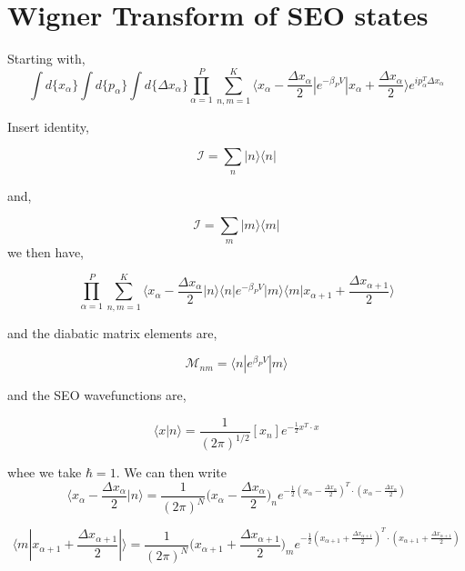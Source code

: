 \section{Wigner Transform of SEO states}
Starting with,
\begin{equation}
\int d \{x_{\alpha}\} \int d \{p_{\alpha}\} \int d \{\Delta x_{\alpha}\} \prod_{\alpha=1}^{P} \sum_{n,m=1}^{K} \langle  x_{\alpha}- \frac{\Delta x_{\alpha}}{2}| e^{-\beta_P V}|x_{\alpha}+ \frac{\Delta x_{\alpha}}{2}\rangle e^{ip_{\alpha}^T \Delta x_{\alpha}}
\end{equation}

Insert identity, 

\begin{equation}
\mathcal{I} = \sum_{n} |n\rangle \langle n|
\end{equation}

and, 

\begin{equation}
\mathcal{I} = \sum_{m} |m\rangle \langle m|
\end{equation}
we then have, 

\begin{equation}
\prod_{\alpha=1}^{P} \sum_{n,m=1}^{K} \langle  x_{\alpha}- \frac{\Delta x_{\alpha}}{2}|n\rangle \langle n|e^{-\beta_P V}|m\rangle \langle m|x_{\alpha+1}+ \frac{\Delta x_{\alpha+1}}{2}\rangle 
\end{equation}

and the diabatic matrix elements are,

\begin{equation}
\mathcal{M}_{nm} = \langle n|e^{\beta_P V}|m\rangle
\end{equation}

and the SEO wavefunctions are,

\begin{equation}
\langle  x |n\rangle = \frac{1}{(2\pi)^{1/2}} [x_n]e^{-\frac{1}{2} x^T\cdot x}
\end{equation}

whee we take $\hbar =1$. We can then write 
\begin{equation}
\langle  x_{\alpha}- \frac{\Delta x_{\alpha}}{2}|n\rangle=\frac{1}{(2\pi)^{N}}\bigg(x_{\alpha}- \frac{\Delta x_{\alpha}}{2}\bigg)_n e^{-\frac{1}{2} (x_{\alpha}- \frac{\Delta x_{\alpha}}{2})^T\cdot (x_{\alpha}- \frac{\Delta x_{\alpha}}{2})}
\end{equation}

\begin{equation}
\langle m| x_{\alpha+1}+ \frac{\Delta x_{\alpha+1}}{2}|\rangle=\frac{1}{(2\pi)^{N}}\bigg(x_{\alpha+1}+ \frac{\Delta x_{\alpha+1}}{2}\bigg)_m e^{-\frac{1}{2} (x_{\alpha+1}+ \frac{\Delta x_{\alpha+1}}{2})^T\cdot (x_{\alpha+1}+ \frac{\Delta x_{\alpha+1}}{2})}
\end{equation}


